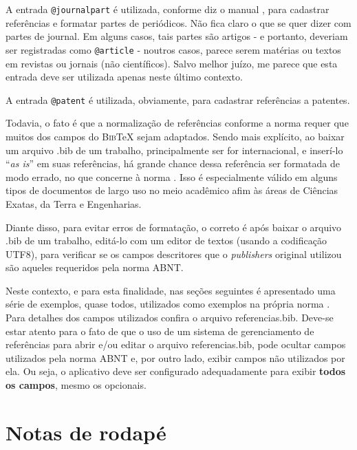 \begin{apendicesenv}
    A entrada \verb|@journalpart| é utilizada, conforme diz o manual \cite{abnTeX22014d}, para cadastrar referências e formatar partes de periódicos.
    Não fica claro o que se quer dizer com partes de journal.
    Em alguns casos, tais partes são artigos - e portanto, deveriam ser registradas como \verb|@article| - noutros casos, parece serem matérias ou textos em revistas ou jornais (não científicos).
    Salvo melhor juízo, me parece que esta entrada deve ser utilizada apenas neste último contexto.

    A entrada \verb|@patent| é utilizada, obviamente, para cadastrar referências a patentes.

    Todavia, o fato é que a normalização de referências conforme a norma  requer que muitos dos campos do \textsc{Bib}\TeX{} sejam adaptados.
    Sendo mais explícito, ao baixar um arquivo {\ttfamily .bib} de um trabalho, principalmente ser for internacional, e inserí-lo ``\textit{as is}'' em suas referências, há grande chance dessa referência ser formatada de modo errado, no que concerne à norma .
    Isso é especialmente válido em alguns tipos de documentos de largo uso no meio acadêmico afim às áreas de Ciências Exatas, da Terra e Engenharias.

    Diante disso, para evitar erros de formatação, o correto é após baixar o arquivo {\ttfamily .bib} de um trabalho, editá-lo com um editor de textos (usando a codificação UTF8), para verificar se os campos descritores que o \textit{publishers} original utilizou são aqueles requeridos pela norma ABNT.

    Neste contexto, e para esta finalidade, nas seções seguintes é apresentado uma série de exemplos, quase todos, utilizados como exemplos na própria norma .
    Para detalhes dos campos utilizados confira o arquivo {\ttfamily referencias.bib}.
    Deve-se estar atento para o fato de que o uso de um sistema de gerenciamento de referências para abrir e/ou editar o arquivo {\ttfamily referencias.bib}, pode ocultar campos utilizados pela norma ABNT e, por outro lado, exibir campos não utilizados por ela.
    Ou seja, o aplicativo deve ser configurado adequadamente para exibir \textbf{todos os campos}, mesmo os opcionais.

    \section{Notas de rodapé}
    \label{sec_notas_de_rodape}


\end{apendicesenv}

